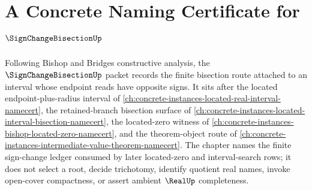 \chapter{A Concrete Naming Certificate for $\SignChangeBisectionUp$}
\label{ch:concrete-instances-sign-change-bisection-namecert}

Following Bishop and Bridges constructive analysis, the $\SignChangeBisectionUp$ packet records the finite bisection route attached to an interval whose endpoint reads have opposite signs. It sits after the located endpoint-plus-radius interval of \autoref{ch:concrete-instances-located-real-interval-namecert}, the retained-branch bisection surface of \autoref{ch:concrete-instances-located-interval-bisection-namecert}, the located-zero witness of \autoref{ch:concrete-instances-bishop-located-zero-namecert}, and the theorem-object route of \autoref{ch:concrete-instances-intermediate-value-theorem-namecert}. The chapter names the finite sign-change ledger consumed by later located-zero and interval-search rows; it does not select a root, decide trichotomy, identify quotient real names, invoke open-cover compactness, or assert ambient $\RealUp$ completeness.

